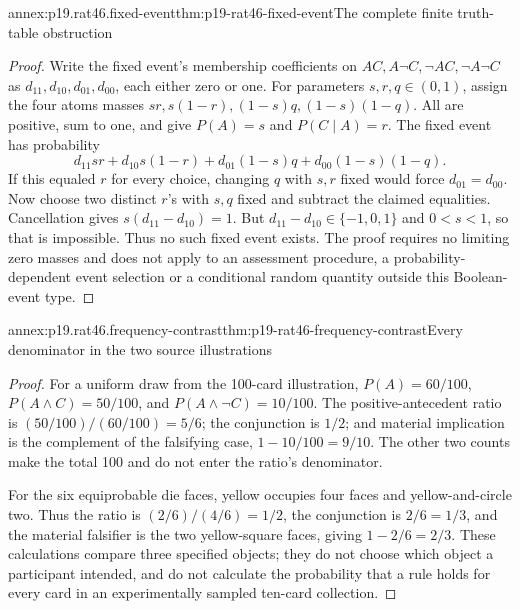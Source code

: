 \begin{annexitem}{annex:p19.rat46.fixed-event}{thm:p19-rat46-fixed-event}{The complete finite truth-table obstruction}
\begin{proof}
Write the fixed event's membership coefficients on
\(A C,A\neg C,\neg A C,\neg A\neg C\) as
\(d_{11},d_{10},d_{01},d_{00}\), each either zero or one.
For parameters \(s,r,q\in(0,1)\), assign the four atoms masses
\(sr,s(1-r),(1-s)q,(1-s)(1-q)\). All are positive, sum to one,
and give \(P(A)=s\) and \(P(C\mid A)=r\).
The fixed event has probability
\[
 d_{11}sr+d_{10}s(1-r)
       +d_{01}(1-s)q+d_{00}(1-s)(1-q).
\]
If this equaled \(r\) for every choice, changing \(q\) with
\(s,r\) fixed would force \(d_{01}=d_{00}\).
Now choose two distinct \(r\)'s with \(s,q\) fixed and subtract
the claimed equalities. Cancellation gives
\(s(d_{11}-d_{10})=1\). But
\(d_{11}-d_{10}\in\{-1,0,1\}\) and \(0<s<1\), so that is
impossible. Thus no such fixed event exists. The proof requires no
limiting zero masses and does not apply to an assessment procedure,
a probability-dependent event selection or a conditional random quantity
outside this Boolean-event type.
\end{proof}
\end{annexitem}

\begin{annexitem}{annex:p19.rat46.frequency-contrast}{thm:p19-rat46-frequency-contrast}{Every denominator in the two source illustrations}
\begin{proof}
For a uniform draw from the 100-card illustration,
\(P(A)=60/100\), \(P(A\land C)=50/100\), and
\(P(A\land\neg C)=10/100\). The positive-antecedent ratio is
\((50/100)/(60/100)=5/6\); the conjunction is \(1/2\);
and material implication is the complement of the falsifying case,
\(1-10/100=9/10\). The other two counts make the total 100 and
do not enter the ratio's denominator.

For the six equiprobable die faces, yellow occupies four faces and
yellow-and-circle two. Thus the ratio is \((2/6)/(4/6)=1/2\),
the conjunction is \(2/6=1/3\), and the material falsifier is the
two yellow-square faces, giving \(1-2/6=2/3\). These calculations
compare three specified objects; they do not choose which object a
participant intended, and do not calculate the probability that a rule
holds for every card in an experimentally sampled ten-card collection.
\end{proof}
\end{annexitem}

